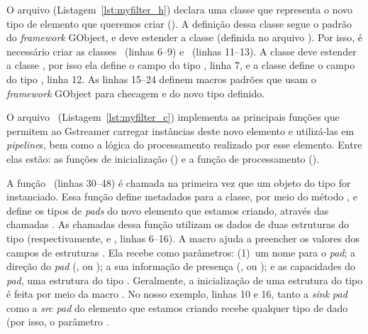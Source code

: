 O arquivo  (Listagem~\ref{lst:myfilter_h}) declara uma classe que
representa o novo tipo de elemento que queremos criar ().  A
definição dessa classe segue o padrão do \emph{framework} GObject, e deve
estender a classe  (definida no arquivo ).  Por
isso, é necessário criar as classes ~(linhas 6--9) e
~(linhas 11--13).  A classe  deve estender a
classe , por isso ela define o campo  do tipo
, linha 7, e a classe  define o campo
 do tipo , linha 12.  As linhas 15--24
definem macros padrões que usam o \emph{framework} GObject para checagem e
 do novo tipo definido.



O arquivo ~(Listagem~\ref{lst:myfilter_c}) implementa as
principais funções que permitem ao Gstreamer carregar instâncias deste novo
elemento e utilizá-las em \emph{pipeline}s, bem como a lógica do processamento
realizado por esse elemento.  Entre elas estão: as funções de inicialização
() e a função de processamento ().

A função ~(linhas 30--48) é chamada na primeira vez
que um objeto do tipo  for instanciado.  Essa função define
metadados para a classe, por meio do método ,
e define os tipos de \emph{pads} do novo elemento que estamos criando, através
das chamadas .  As chamadas dessa função
utilizam os dados de duas estruturas do tipo 
(respectivamente,  e , linhas 6--16).  A macro
 ajuda a preencher os valores dos campos de
estruturas .  Ela recebe como parâmetros: (1)~um nome
para o \emph{pad}; a direção do \emph{pad} (,
 ou ); a sua informação de presença
(,  ou ); e as
capacidades do \emph{pad}, uma estrutura do tipo .  Geralmente, a
inicialização de uma estrutura do tipo  é feita por meio da macro
. No nosso exemplo, linhas 10 e 16, tanto a \emph{sink pad}
como a \emph{src pad} do elemento que estamos criando recebe qualquer tipo de
dado (por isso, o parâmetro .

